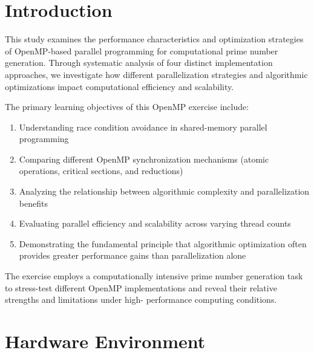 \documentclass[11pt]{article}
\begin{document}






%








\section{Introduction}
This study examines the performance characteristics and optimization strategies of OpenMP-based
parallel programming for computational prime number generation. Through systematic analysis of
four distinct implementation approaches, we investigate how different parallelization strategies and
algorithmic optimizations impact computational efficiency and scalability.

The primary learning objectives of this OpenMP exercise include:
\begin{enumerate}
  \item{Understanding race condition avoidance in shared-memory parallel programming}
  \item{Comparing different OpenMP synchronization mechanisms (atomic operations, critical sections, and reductions)}
  \item{Analyzing the relationship between algorithmic complexity and parallelization benefits}
  \item{Evaluating parallel efficiency and scalability across varying thread counts}
  \item{Demonstrating the fundamental principle that algorithmic optimization often provides greater 
  performance gains than parallelization alone}
\end{enumerate}

The exercise employs a computationally intensive prime number generation task to stress-test
different OpenMP implementations and reveal their relative strengths and limitations under high-
performance computing conditions.

\section{Hardware Environment}
\end{document}
